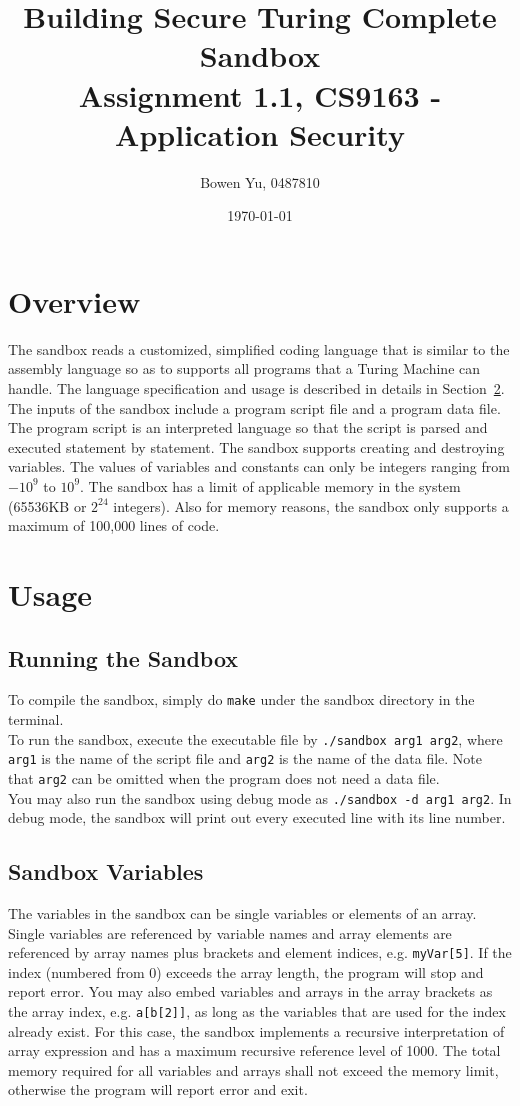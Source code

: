 \documentclass[11pt]{article}
\title{\bf Building Secure Turing Complete Sandbox\\[2ex] 
       \rm\Large Assignment 1.1, CS9163 - Application Security}
\author{Bowen Yu, 0487810}
\date{\today}
\begin{document}
\maketitle
\large

\section{Overview}
The sandbox reads a customized, simplified coding language that is similar to the assembly language so as to supports all programs that a Turing Machine can handle. The language specification and usage is described in details in Section~\ref{sec:usage}. The inputs of the sandbox include a program script file and a program data file. The program script is an interpreted language so that the script is parsed and executed statement by statement. The sandbox supports creating and destroying variables. The values of variables and constants can only be integers ranging from $-10^{9}$ to $10^{9}$. The sandbox has a limit of applicable memory in the system (65536KB or $2^{24}$ integers). Also for memory reasons, the sandbox only supports a maximum of 100,000 lines of code.

\section{Usage}
\label{sec:usage}
\subsection{Running the Sandbox}
To compile the sandbox, simply do {\tt make} under the sandbox directory in the terminal.\\
To run the sandbox, execute the executable file by {\tt ./sandbox arg1 arg2}, where {\tt arg1} is the name of the script file and {\tt arg2} is the name of the data file. Note that {\tt arg2} can be omitted when the program does not need a data file.\\
You may also run the sandbox using debug mode as {\tt ./sandbox -d arg1 arg2}. In debug mode, the sandbox will print out every executed line with its line number.

\subsection{Sandbox Variables}
The variables in the sandbox can be single variables or elements of an array. Single variables are referenced by variable names and array elements are referenced by array names plus brackets and element indices, e.g. {\tt myVar[5]}. If the index (numbered from 0) exceeds the array length, the program will stop and report error. You may also embed variables and arrays in the array brackets as the array index, e.g. {\tt a[b[2]]}, as long as the variables that are used for the index already exist. For this case, the sandbox implements a recursive interpretation of array expression and has a maximum recursive reference level of 1000. The total memory required for all variables and arrays shall not exceed the memory limit, otherwise the program will report error and exit.
\end{document}
